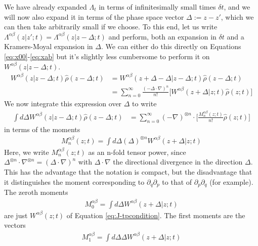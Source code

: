 \documentclass[aps,pra,showpacs,citeautoscript,amsmath,amssymb,floatfix,superscriptaddress,bbm, verbatim,amsfonts,changes,12pt,nofootinbib,longbibliography]{revtex4-2}
\def\X{\Lambda}
\def\z{{z}}
\def\dist{{\Delta}}
\def\ddist{{d\!\dist}}
\def\dt{\delta t}
\def\rate{{W}}
\def\ab{^{\alpha\beta}}
\newcommand{\M}[1]{M_{#1}\ab}
\renewcommand{\varrho}{\hat{\rho}}
\def\psiz{{\varrho(\z;t)}}
\def\psizd{{\varrho(\z-\dist;t)}}
\begin{document}
We have already expanded $\X_t$ in terms of infinitesimally small times $\dt$, and we will now also expand it in terms of the phase space vector $\dist:=\z-\z'$, which we can then take arbitrarily small if we choose.  
To this end, let us write $\X^{\alpha\beta}(\z|\z';t)=\X^{\alpha\beta}(\z|\z-\dist;t)$ 
and perform, both an expansion in $\dt$ and a Kramers-Moyal expansion\cite{kramers1940brownian,moyal1949stochastic} in $\dist$. We can either do this directly on
Equations \eqref{eq:x00}-\eqref{eq:xab} but it's slightly less cumbersome to perform it on $\rate^{\alpha\beta}(\z|\z-\dist;t)$.
\begin{align}
\rate^{\alpha\beta}(\z|\z-\dist;t)\psizd
&=\rate^{\alpha\beta}(\z+\dist-\dist|\z-\dist;t)\psizd
\nonumber\\
&=\sum_{n=0}^\infty\frac{(-\dist\cdot\nabla)^n}{n!}\big[\rate^{\alpha\beta}(\z+\dist|\z;t)\psiz\big]
\end{align}
We now integrate this expression over $\dist$ to write
\begin{align}
\int \ddist\rate^{\alpha\beta}(\z|\z-\dist;t)\psizd
&=\sum_{n=0}^\infty(-\nabla)^{\otimes n}\cdot\big[\frac{\M{n}(\z;t)}{n!}\psiz\big]
\end{align}
in terms of the moments
\begin{align}
{\M{n}(\z;t)}=\int\ddist (\dist)^{\otimes n} \rate^{\alpha\beta}(\z+\dist|\z;t)
\label{eq:momentdef}
\end{align}
Here, we write $\M{n}(\z;t)$ as an n-fold tensor power, since $\dist^{\otimes n}\cdot\nabla^{\otimes n}=(\dist\cdot\nabla)^n$ with $\dist\cdot\nabla$ the directional divergence in the direction $\dist$. This has the advantage that the notation is compact, but the disadvantage that it distinguishes the moment corresponding to $\partial_q\partial_p$ to that of $\partial_p\partial_q$ (for example).
The zeroth moments
\begin{align}
\M{0}=\int\ddist W\ab(\z+\dist|\z;t)
\label{eq:zeroeth}
\end{align}
are just $W\ab(\z;t)$ of Equation \eqref{eq:J-tpcondition}. The first moments are the vectors
\begin{align}
\M{1}=\int\ddist \dist W\ab(\z+\dist|\z;t)
\end{align}
\end{document}
